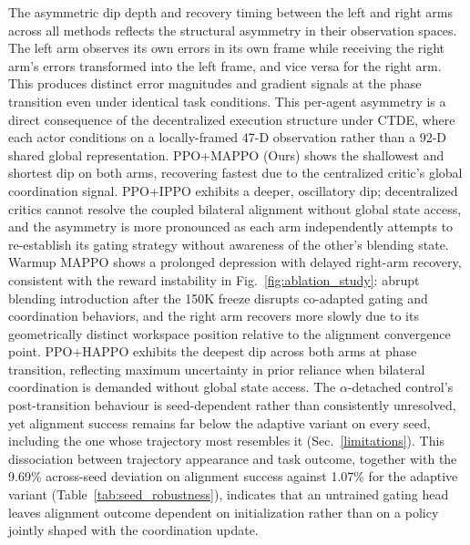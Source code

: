 \documentclass[a4paper,fleqn]{cas-dc}
\begin{document}
The asymmetric dip depth and recovery timing between the left and right arms across all methods reflects the structural asymmetry in their observation spaces. The left arm observes its own errors in its own frame while receiving the right arm's errors transformed into the left frame, and vice versa for the right arm. This produces distinct error magnitudes and gradient signals at the phase transition even under identical task conditions. This per-agent asymmetry is a direct consequence of the decentralized execution structure under CTDE, where each actor conditions on a locally-framed 47-D observation rather than a 92-D shared global representation. PPO+MAPPO (Ours) shows the shallowest and shortest dip on both arms, recovering fastest due to the centralized critic's global coordination signal. PPO+IPPO exhibits a deeper, oscillatory dip; decentralized critics cannot resolve the coupled bilateral alignment without global state access, and the asymmetry is more pronounced as each arm independently attempts to re-establish its gating strategy without awareness of the other's blending state. Warmup MAPPO shows a prolonged depression with delayed right-arm recovery, consistent with the reward instability in Fig.~\ref{fig:ablation_study}: abrupt blending introduction after the 150K freeze disrupts co-adapted gating and coordination behaviors, and the right arm recovers more slowly due to its geometrically distinct workspace position relative to the alignment convergence point. PPO+HAPPO exhibits the deepest dip across both arms at phase transition, reflecting maximum uncertainty in prior reliance when bilateral coordination is demanded without global state access. The $\alpha$-detached control's post-transition behaviour is seed-dependent rather than consistently unresolved, yet alignment success remains far below the adaptive variant on every seed, including the one whose trajectory most resembles it (Sec.~\ref{limitations}). This dissociation between trajectory appearance and task outcome, together with the 9.69\% across-seed deviation on alignment success against 1.07\% for the adaptive variant (Table~\ref{tab:seed_robustness}), indicates that an untrained gating head leaves alignment outcome dependent on initialization rather than on a policy jointly shaped with the coordination update.
\end{document}
